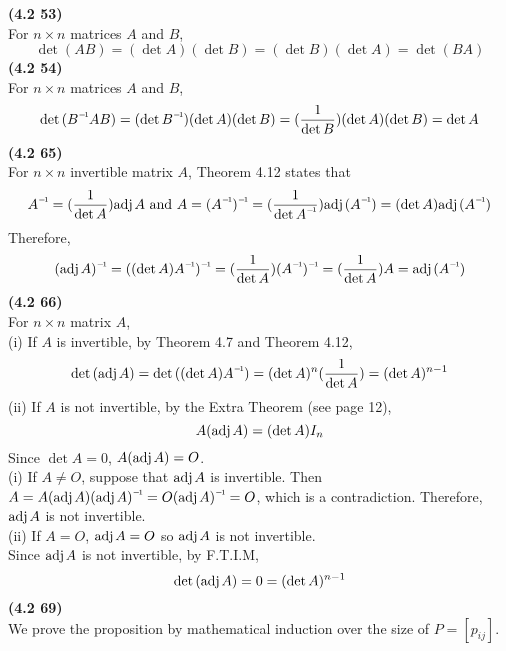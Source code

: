 \textbf{(4.2 53)} \\
For $n \times n$ matrices $A$ and $B$,
\begin{equation*}
	\det{(AB)} = (\det{A})(\det{B}) = (\det{B})(\det{A}) = \det{(BA)}
\end{equation*}
\textbf{(4.2 54)} \\
For $n \times n$ matrices $A$ and $B$, \begin{equation*}
	\det{(\inv{B}AB)} = (\det{\inv{B}})(\det{A})(\det{B}) = (\frac{1}{\det{B}})(\det{A})(\det{B}) = \det{A}
\end{equation*}
\textbf{(4.2 65)} \\
For $n \times n$ invertible matrix $A$, Theorem 4.12 states that \begin{equation*}
	\inv{A} = (\frac{1}{\det{A}})\adj{A} \mbox{ and } A = \inv{(\inv{A})} = (\frac{1}{\det{\inv{A}}})\adj{(\inv{A})} = (\det{A})\adj{(\inv{A})}
\end{equation*} Therefore, \begin{align*}
	\inv{(\adj{A})} = \inv{((\det{A})\inv{A})} = (\frac{1}{\det{A}})\inv{(\inv{A})} = (\frac{1}{\det{A}})A = \adj{(\inv{A})}
\end{align*}
\textbf{(4.2 66)} \\
For $n \times n$ matrix $A$, \\
(i) If $A$ is invertible, by Theorem 4.7 and Theorem 4.12, \begin{align*}
	\det{(\adj{A})} = \det{((\det{A})\inv{A})} = (\det{A})^n(\frac{1}{\det{A}}) = (\det{A})^{n-1}
\end{align*}
(ii) If $A$ is not invertible, by the Extra Theorem (see page 12), \begin{equation*}
	A(\text{adj}\hspace{.3ex}{A}) = (\det{A})I_n
\end{equation*} Since $\det{A} = 0$, $A(\text{adj}\hspace{.3ex}{A}) = O$. \\

(i) If $A \neq O$, suppose that $\text{adj}\hspace{.3ex}{A}$ is invertible. Then $A = A(\adj{A})\inv{(\adj{A})} = O\inv{(\adj{A})} = O$, which is a contradiction. Therefore, $\text{adj}\hspace{.3ex}{A}$ is not invertible. \\

(ii) If $A = O$, $\text{adj}\hspace{.3ex}{A} = O$ so $\text{adj}\hspace{.3ex}{A}$ is not invertible. \\

Since $\text{adj}\hspace{.3ex}{A}$ is not invertible, by F.T.I.M, \begin{equation*}
	\det{(\text{adj}\hspace{.3ex}{A})} = 0 = (\det{A})^{n-1}
\end{equation*}
\textbf{(4.2 69)} \\
We prove the proposition by mathematical induction over the size of $P = [p_{ij}]$. \\

